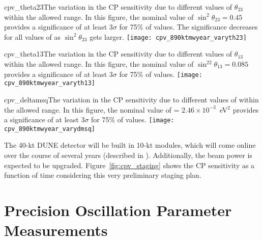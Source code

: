 \begin{cdrfigure}{cpv_theta23}{The variation in the CP sensitivity due to different values of $\theta_{23}$ within the allowed range.  In this figure, the nominal value of $\sin^2\theta_{23} = 0.45$ provides a significance of at least 3$\sigma$ for 75\% of \deltacp values.  The significance decreases for all values of \deltacp as $\sin^2\theta_{23}$ gets larger.}
 \texttt{[image: cpv\_890ktmwyear\_varyth23]}
\end{cdrfigure}

\begin{cdrfigure}{cpv_theta13}{The variation in the CP sensitivity due to different values of $\theta_{13}$ within the allowed range.  In this figure, the nominal value of $\sin^22\theta_{13} = 0.085$ provides a significance of at least 3$\sigma$ for 75\% of \deltacp values.}
 \texttt{[image: cpv\_890ktmwyear\_varyth13]}
\end{cdrfigure}

\begin{cdrfigure}{cpv_deltamsq}{The variation in the CP sensitivity due to different values of  within the allowed range.  In this figure, the nominal value of  = $2.46\times 10^{-3}$~eV$^2$ provides a significance of at least 3$\sigma$ for 75\% of \deltacp values.}
 \texttt{[image: cpv\_890ktmwyear\_varydmsq]}
\end{cdrfigure}

The 40-kt DUNE detector will be built in 10-kt modules, which will come online over the course of several years (described in \voldune).  Additionally, the beam power is expected to be upgraded. Figure~\ref{fig:cpv_staging} shows the CP sensitivity as a function of time considering this very preliminary staging plan. 


\section{Precision Oscillation Parameter Measurements}

